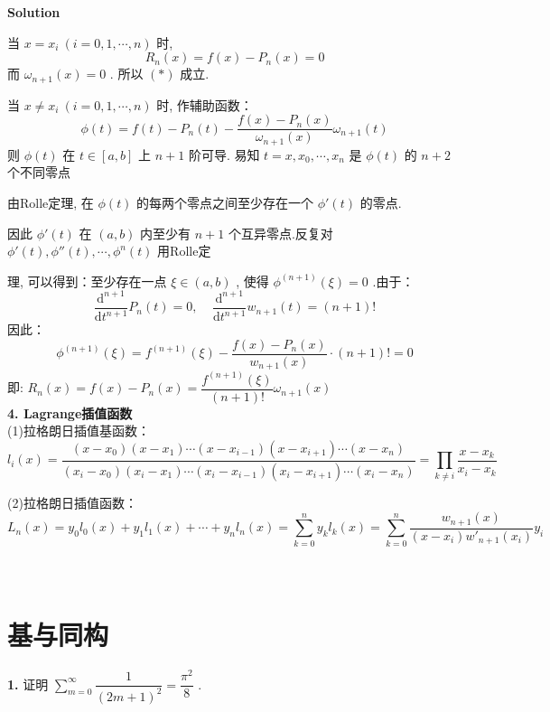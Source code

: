 \documentclass[11pt,a4paper,openany,oneside]{book}
\newcommand\Solution{\noindent\textbf{\textsf{Solution}}\par\medskip}
\begin{document}
\Solution 
当 $ x = x_i\ (i = 0, 1, \cdots, n) $ 时, 
 $$  R_n(x) = f(x) - P_n(x) = 0  $$ 
\hspace{2.7em} 而 $ \omega_{n+1}(x) = 0 $ . 所以 $ (*) $ 成立. 

\hspace{2.7em} 当 $ x \neq x_i\ (i=0, 1, \cdots, n) $ 时, 作辅助函数：
 $$  \phi(t) = f(t) - P_n(t) - \dfrac{f(x) - P_n(x)}{\omega_{n+1}(x)}\omega_{n+1}(t)  $$  
\hspace{2.7em} 则 $ \phi(t) $ 在 $ t \in [a,b] $ 上 $ n+1 $ 阶可导. 易知 $ t = x, x_0,\cdots, x_n $ 是 $ \phi(t) $ 的 $ n+2 $ 个不同零点

\hspace{2.7em} 由Rolle定理, 在 $ \phi(t) $ 的每两个零点之间至少存在一个 $ \phi'(t) $ 的零点. 

\hspace{2.7em} 因此 $ \phi'(t) $ 在 $ (a,b) $ 内至少有 $ n+1 $ 个互异零点.反复对 $ \phi'(t), \phi''(t), \cdots, \phi^{n}(t) $ 用Rolle定

\hspace{2.7em} 理, 可以得到：至少存在一点 $ \xi \in (a,b) $ , 使得 $ \phi^{(n+1)}(\xi)=0 $ .由于：
 $$  \dfrac{\mathrm{d}^{n+1}}{\mathrm{d}t^{n+1}}P_n(t) = 0,\ \ \ \ \ \dfrac{\mathrm{d}^{n+1}}{\mathrm{d}t^{n+1}}w_{n+1}(t) = (n+1)!   $$ 
\hspace{2.7em} 因此：
 $$  \phi^{(n+1)}(\xi) = f^{(n+1)}(\xi) - \dfrac{f(x) - P_n(x)}{w_{n+1}(x)}\cdot(n+1)! = 0  $$ 
\hspace{2.7em} 即: $ R_n(x) = f(x) - P_n(x) =\dfrac{f^{(n+1)}(\xi)}{(n+1)!}\omega_{n+1}(x)  $  \\

\textbf{4. Lagrange插值函数} \\
(1)拉格朗日插值基函数：
 $$ l_i(x) = \dfrac{(x-x_0)(x-x_1)\cdots(x-x_{i-1})(x-x_{i+1})\cdots(x-x_n)}{(x_i-x_0)(x_i-x_1)\cdots(x_i-x_{i-1})(x_i-x_{i+1})\cdots(x_i-x_n)} = \prod\limits_{k\neq i} \dfrac{x-x_k}{x_i-x_k} $$ 

(2)拉格朗日插值函数：
 $$  L_n(x) = y_0l_0(x) + y_1l_1(x) + \cdots + y_nl_n(x) = \sum\limits_{k=0}^n y_kl_k(x) = \sum\limits_{k=0}^n\dfrac{w_{n+1}(x)}{(x-x_i)w'_{n+1}(x_i)}y_i  $$  \\  \\  

\section{基与同构}
\begin{myexample}
	\textbf{1.} 
	证明  $ \sum\limits_{m=0}^{\infty}\dfrac{1}{(2m+1)^2}=\dfrac{\pi^2}{8} $ .
\end{myexample}
\end{document}
